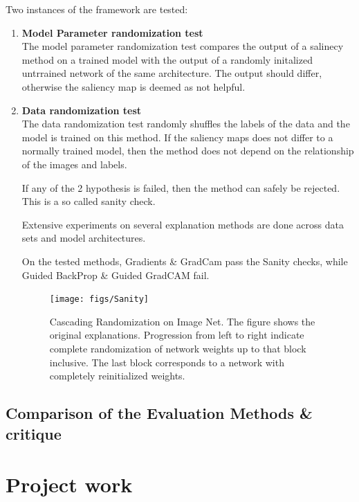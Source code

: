 Two instances of the framework are tested:

\begin{enumerate}
	\item \textbf{Model Parameter randomization test}\\
		The model parameter randomization test compares the output of a salinecy method on a trained model with the output of a randomly initalized untrrained network of the same architecture. The output should differ, otherwise the saliency map is deemed as not helpful.
	\item \textbf{Data randomization test}\\
		The data randomization test randomly shuffles the labels of the data and the model is trained on this method. If the saliency maps does not differ to a normally trained model, then the method does not depend on the relationship of the images and labels.

If any of the 2 hypothesis is failed, then the method can safely be rejected. This is a so called sanity check.

Extensive experiments on several explanation methods are done across data sets and model architectures. 

On the tested methods, Gradients \& GradCam pass the Sanity checks, while Guided BackProp \& Guided GradCAM fail.

\begin{figure}[h!]
	\centering
	\texttt{[image: figs/Sanity]}
	\caption{Cascading Randomization on Image Net. The figure shows the original explanations. Progression from left to right indicate complete randomization of network weights up to that block inclusive. The last block corresponds to a network with completely reinitialized weights.\cite{adebayo2020sanity}}
	\label{fig:Sanity}
\end{figure}


\end{enumerate}

\section{Comparison of the Evaluation Methods \& critique}





\chapter{Project work} %
\label{sec:project}

